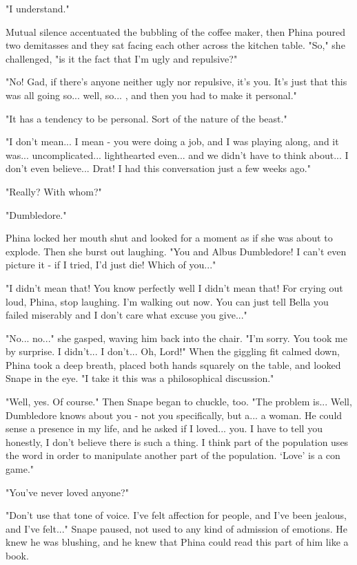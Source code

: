 "I understand."

Mutual silence accentuated the bubbling of the coffee maker, then Phina poured two demitasses and they sat facing each other across the kitchen table. "So," she challenged, "is it the fact that I'm ugly and repulsive?"

"No! Gad, if there's anyone neither ugly nor repulsive, it's you. It's just that this was all going so... well, so... , and then you had to make it personal."

"It has a tendency to be personal. Sort of the nature of the beast."

"I don't mean... I mean - you were doing a job, and I was playing along, and it was... uncomplicated... lighthearted even... and we didn't have to think about... I don't even believe... Drat! I had this conversation just a few weeks ago."

"Really? With whom?"

"Dumbledore."

Phina locked her mouth shut and looked for a moment as if she was about to explode. Then she burst out laughing. "You and Albus Dumbledore! I can't even picture it - if I tried, I'd just die! Which of you..."

"I didn't mean that! You know perfectly well I didn't mean that! For crying out loud, Phina, stop laughing. I'm walking out now. You can just tell Bella you failed miserably and I don't care what excuse you give..."

"No... no..." she gasped, waving him back into the chair. "I'm sorry. You took me by surprise. I didn't... I don't... Oh, Lord!" When the giggling fit calmed down, Phina took a deep breath, placed both hands squarely on the table, and looked Snape in the eye. "I take it this was a philosophical discussion."

"Well, yes. Of course." Then Snape began to chuckle, too. "The problem is... Well, Dumbledore knows about you - not you specifically, but a... a woman. He could sense a presence in my life, and he asked if I loved... you. I have to tell you honestly, I don't believe there is such a thing. I think part of the population uses the word in order to manipulate another part of the population. `Love' is a con game."

"You've never loved anyone?"

"Don't use that tone of voice. I've felt affection for people, and I've been jealous, and I've felt..." Snape paused, not used to any kind of admission of emotions. He knew he was blushing, and he knew that Phina could read this part of him like a book.

